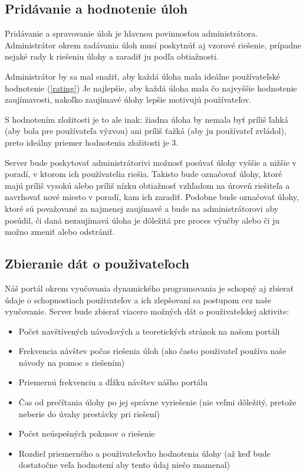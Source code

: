 \subsection{Pridávanie a hodnotenie úloh}
Pridávanie a spravovanie úloh je hlavnou povinnosťou administrátora. Administrátor okrem zadávania úloh musí poskytnúť aj vzorové riešenie, prípadne nejaké rady k riešeniu úlohy a zaradiť ju podľa obtiažnosti.

Administrátor by sa mal snažiť, aby každá úloha mala ideálne používateľské hodnotenie (\ref{rating})
Je najlepšie, aby každá úloha mala čo najvyššie hodnotenie zaujímavosti, nakoľko zaujímavé úlohy lepšie motivujú používateľov.

S hodnotením zložitosti je to ale inak: žiadna úloha by nemala byť príliš ľahká (aby bola pre používateľa výzvou) ani
príliš ťažká (aby ju používateľ zvládol), preto ideálny priemer hodnotenia zložitosti je 3.

Server bude poskytovať administrátorivi možnosť posúvať úlohy vyššie a nižšie v poradí, v ktorom ich používatelia riešia. Takisto bude označovať úlohy, ktoré majú príliš vysokú alebo príliš nízku obtiažnosť vzhľadom na úroveň riešiteľa a navrhovať nové miesto v poradí, kam ich zaradiť. Podobne bude označovať úlohy, ktoré sú považované za najmenej zaujímavé a bude na administrátorovi aby posúdil, či daná nezaujímavá úloha je dôležitá pre proces výučby alebo či ju možno zmeniť alebo odstrániť.
\subsection{Zbieranie dát o použivateľoch}
\label{zbieraniedata}
Náš portál okrem vyučovania dynamického programovania je schopný aj zbierať údaje o schopnostiach použivateľov a ich zlepšovaní sa postupom cez naše vyučovanie. Server bude zbierať viacero možných dát o použivateľskej aktivite:
\begin{itemize}
\item Počet navštívených návodových a teoretických stránok na našom portáli
\item Frekvencia návštev počas riešenia úloh (ako často použivateľ používa naše návody na pomoc s riešením)
\item Priemernú frekvenciu a dĺžku návštev nášho portálu
\item Čas od prečítania úlohy po jej správne vyriešenie (nie veľmi dôležitý, pretože neberie do úvahy prestávky pri riešení)
\item Počet neúspešných pokusov o riešenie
\item Rozdiel priemerného a použivateľovho hodnotenia úlohy (až keď bude dostatočne veľa hodnotení aby tento údaj niečo znamenal)
\end{itemize}

